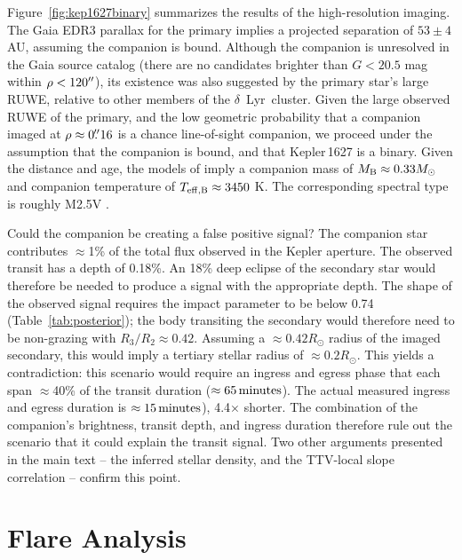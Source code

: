 \documentclass[12pt,modern,twocolumn,tighten]{aastex63}
\newcommand{\cn}{$\delta$\ Lyr\ cluster} %
\begin{document}
Figure~\ref{fig:kep1627binary} summarizes the results of the
high-resolution imaging.  
The Gaia EDR3 parallax for the primary implies a projected separation
of $53 \pm 4$\,AU, assuming the companion is bound. 
Although the companion is unresolved in the
Gaia source catalog (there are no candidates brighter than $G < 20.5$ mag within $\rho < 120\mbox{$^{\prime\prime}$}$), its existence was also suggested by the primary
star's large RUWE, relative to other members of the \cn.  Given the
large observed RUWE of the primary, and the low geometric probability
that a companion imaged at $\rho \approx 0\mbox{$.\!\!^{\prime\prime}$}16$ is a chance
line-of-sight companion, we proceed under the assumption that the
companion is bound, and that Kepler\,1627 is a binary. 
Given the distance and age, the models of \citet{baraffe_new_2015} imply
a companion mass of $M_{\rm B} \approx 0.33 M_{\odot}$ and companion
temperature of $T_{\rm eff,B} \approx 3450$ K.
The corresponding spectral type is roughly M2.5V \citep{pecaut_mamajek_2013}.

Could the companion be creating a false positive signal?  The
companion star contributes $\approx$1\% of the total flux observed in
the Kepler aperture.  The observed transit has a depth of 0.18\%.  An
18\% deep eclipse of the secondary star would therefore be needed to
produce a signal with the appropriate depth.  The shape of the
observed signal requires the impact parameter to be below 0.74
(Table~\ref{tab:posterior}); the body transiting the secondary would
therefore need to be non-grazing with $R_3/R_2 \approx 0.42$.
Assuming a $\approx 0.42R_\odot$ radius of the imaged secondary, this
would imply a tertiary stellar radius of $\approx 0.2R_\odot$.  This
yields a contradiction:  this scenario would require an ingress and
egress phase that each span $\approx$40\% of the transit duration
($\approx 65\,{\rm minutes}$).  The actual measured ingress and egress
duration is $\approx 15\,{\rm minutes}$), 4.4$\times$ shorter.  The
combination of the companion's brightness, transit depth, and ingress
duration therefore rule out the scenario that it could explain the
transit signal.  Two other arguments presented in the main text -- the
inferred stellar density, and the TTV-local slope correlation --
confirm this point.


\section{Flare Analysis}
\label{app:flare}
\end{document}
